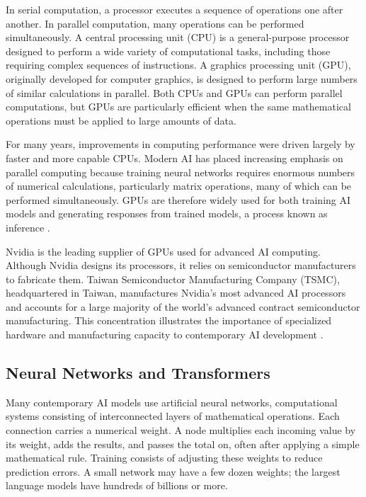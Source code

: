 \documentclass[11pt]{article}
\begin{document}
In serial computation, a processor executes a sequence of operations one after another. In parallel computation, many operations can be performed simultaneously. A central processing unit (CPU) is a general-purpose processor designed to perform a wide variety of computational tasks, including those requiring complex sequences of instructions. A graphics processing unit (GPU), originally developed for computer graphics, is designed to perform large numbers of similar calculations in parallel. Both CPUs and GPUs can perform parallel computations, but GPUs are particularly efficient when the same mathematical operations must be applied to large amounts of data.

For many years, improvements in computing performance were driven largely by faster and more capable CPUs. Modern AI has placed increasing emphasis on parallel computing because training neural networks requires enormous numbers of numerical calculations, particularly matrix operations, many of which can be performed simultaneously. GPUs are therefore widely used for both training AI models and generating responses from trained models, a process known as inference
\citep{NVIDIA2026CUDA}.

Nvidia is the leading supplier of GPUs used for advanced AI computing. Although Nvidia designs its processors, it relies on semiconductor manufacturers to fabricate them. Taiwan Semiconductor Manufacturing Company (TSMC), headquartered in Taiwan, manufactures Nvidia's most advanced AI processors and accounts for a large majority of the world's advanced contract semiconductor manufacturing. This concentration illustrates the importance of specialized hardware and manufacturing capacity to contemporary AI development
\citep{OECD2025AIInfrastructure}.


\subsection{Neural Networks and Transformers}

Many contemporary AI models use artificial neural networks, computational systems consisting of interconnected layers of mathematical operations. Each connection carries a numerical weight. A node multiplies each incoming value by its weight, adds the results, and passes the total on, often after applying a simple mathematical rule. Training consists of adjusting these weights to reduce prediction errors.
A small network may have a few dozen weights; the largest language models have hundreds of billions or more.
\end{document}
